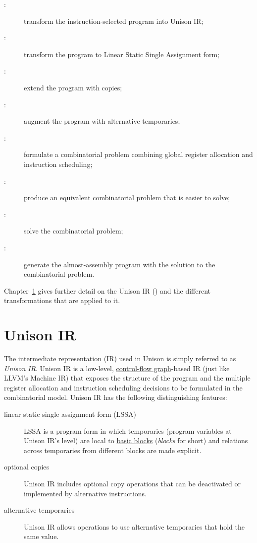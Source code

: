 \documentclass[11pt]{report}
\begin{document}
\begin{description}

\item [:] transform the instruction-selected program into
  Unison IR;

\item [:] transform the program to Linear Static Single
  Assignment form;

\item [:] extend the program with copies;

\item [:] augment the program with alternative temporaries;

\item [:] formulate a combinatorial problem combining global
  register allocation and instruction scheduling;

\item [:] produce an equivalent combinatorial problem
  that is easier to solve;

\item [:] solve the combinatorial problem;

\item [:] generate the almost-assembly program with the
  solution to the combinatorial problem.

\end{description}

Chapter~\ref{sec:unison-ir} gives further detail on the Unison IR ()
and the different transformations that are applied to it.

\chapter{Unison IR}
\label{sec:unison-ir}

The intermediate representation (IR) used in Unison is simply referred to as
\emph{Unison IR}.
%
Unison IR is a low-level,
\href{https://en.wikipedia.org/wiki/Control_flow_graph}{control-flow
  graph}-based IR (just like LLVM's Machine IR) that exposes the structure of
the program and the multiple register allocation and instruction scheduling
decisions to be formulated in the combinatorial model.
%
Unison IR has the following distinguishing features:
%
\begin{description}
\item [linear static single assignment form (LSSA)] LSSA is a program form in
  which temporaries (program variables at Unison IR's level) are local to
  \href{https://en.wikipedia.org/wiki/Basic_block}{basic blocks} (\emph{blocks}
  for short) and relations across temporaries from different blocks are made
  explicit.
\item [optional copies] Unison IR includes optional copy operations that can be
  deactivated or implemented by alternative instructions.
\item [alternative temporaries] Unison IR allows operations to use alternative
  temporaries that hold the same value.
\end{description}
\end{document}
